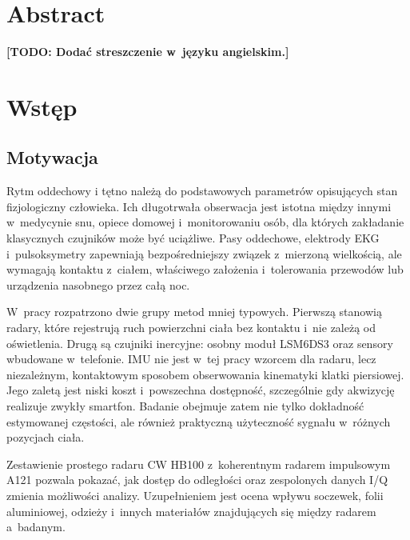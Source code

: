 \documentclass[12pt,a4paper,oneside]{report}
\newcommand{\todo}[1]{\textcolor{red!75!black}{\textbf{[TODO: #1]}}}
\begin{document}
\clearpage
\chapter*{Abstract}

\todo{Dodać streszczenie w~języku angielskim.}

\clearpage

\tableofcontents
\listoffigures
\listoftables

\chapter{Wstęp}

\section{Motywacja}
Rytm oddechowy i tętno należą do podstawowych parametrów opisujących stan
fizjologiczny człowieka. Ich długotrwała obserwacja jest istotna między innymi
w~medycynie snu, opiece domowej i~monitorowaniu osób, dla których zakładanie
klasycznych czujników może być uciążliwe. Pasy oddechowe, elektrody EKG
i~pulsoksymetry zapewniają bezpośredniejszy związek z~mierzoną wielkością, ale
wymagają kontaktu z~ciałem, właściwego założenia i~tolerowania przewodów lub
urządzenia nasobnego przez całą noc.

W~pracy rozpatrzono dwie grupy metod mniej typowych. Pierwszą stanowią radary,
które rejestrują ruch powierzchni ciała bez kontaktu i~nie zależą od oświetlenia.
Drugą są czujniki inercyjne: osobny moduł LSM6DS3 oraz sensory wbudowane
w~telefonie. IMU nie jest w~tej pracy wzorcem dla radaru, lecz niezależnym,
kontaktowym sposobem obserwowania kinematyki klatki piersiowej. Jego zaletą jest
niski koszt i~powszechna dostępność, szczególnie gdy akwizycję realizuje zwykły
smartfon. Badanie obejmuje zatem nie tylko dokładność estymowanej częstości, ale
również praktyczną użyteczność sygnału w~różnych pozycjach ciała.

Zestawienie prostego radaru CW HB100 z~koherentnym radarem impulsowym A121
pozwala pokazać, jak dostęp do odległości oraz zespolonych danych I/Q zmienia
możliwości analizy. Uzupełnieniem jest ocena wpływu soczewek, folii aluminiowej,
odzieży i~innych materiałów znajdujących się między radarem a~badanym.
\end{document}
